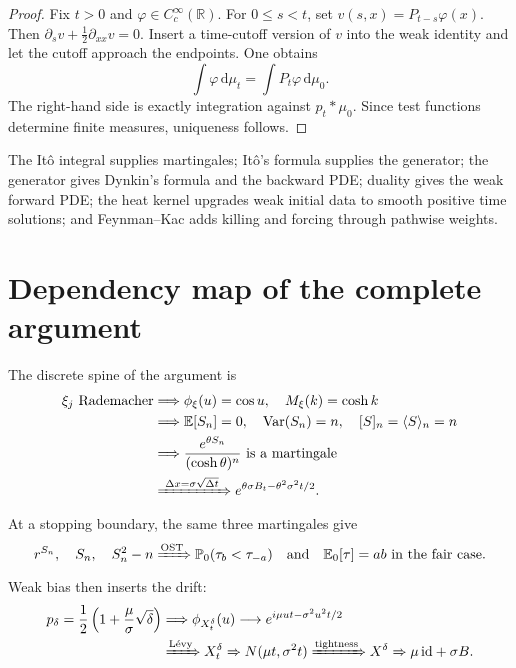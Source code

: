 \documentclass[10pt,a4paper]{article}
\numberwithin{equation}{section}
\theoremstyle{blueplain}
\theoremstyle{definition}
\newcommand{\E}{\mathbb E}
\newcommand{\Pp}{\mathbb P}
\newcommand{\R}{\mathbb R}
\newcommand{\dd}{\,\mathrm d}
\newcommand{\Var}{\operatorname{Var}}
\begin{document}
\begin{proof}
Fix \(t>0\) and \(\varphi\in C_c^\infty(\R)\).  For
\(0\le s<t\), set \(v(s,x)=P_{t-s}\varphi(x)\).  Then
\(\partial_sv+\tfrac12\partial_{xx}v=0\).  Insert a time-cutoff version of
\(v\) into the weak identity and let the cutoff approach the endpoints.  One
obtains
\[
  \int\varphi\dd\mu_t
  =\int P_t\varphi\dd\mu_0.
\]
The right-hand side is exactly integration against \(p_t*\mu_0\).  Since test
functions determine finite measures, uniqueness follows.
\end{proof}

\begin{keybox}
The It\^o integral supplies martingales; It\^o's formula supplies the generator;
the generator gives Dynkin's formula and the backward PDE; duality gives the
weak forward PDE; the heat kernel upgrades weak initial data to smooth positive
time solutions; and Feynman--Kac adds killing and forcing through pathwise
weights.
\end{keybox}

\clearpage
\section{Dependency map of the complete argument}
\begingroup
\small
\setlength{\abovedisplayskip}{4pt plus 1pt minus 1pt}
\setlength{\belowdisplayskip}{4pt plus 1pt minus 1pt}

The discrete spine of the argument is
\begin{align*}
  \xi_j\text{ Rademacher}
  &\Longrightarrow
  \phi_{\xi}(u)=\cos u,\quad M_{\xi}(k)=\cosh k\\
  &\Longrightarrow
  \E[S_n]=0,\quad \Var(S_n)=n,\quad [S]_n=\langle S\rangle_n=n\\
  &\Longrightarrow
  \frac{e^{\theta S_n}}{(\cosh\theta)^n}
  \text{ is a martingale}\\
  &\xRightarrow{\ \Delta x=\sigma\sqrt{\Delta t}\ }
  e^{\theta\sigma B_t-\theta^2\sigma^2t/2}.
\end{align*}
At a stopping boundary, the same three martingales give
\[
  r^{S_n},\quad S_n,\quad S_n^2-n
  \xRightarrow{\mathrm{OST}}
  \Pp_0(\tau_b<\tau_{-a})
  \quad\text{and}\quad
  \E_0[\tau]=ab\ \text{in the fair case}.
\]
Weak bias then inserts the drift:
\begin{align*}
  p_\delta=\frac12\left(1+\frac\mu\sigma\sqrt\delta\right)
  &\Longrightarrow
  \phi_{X_t^\delta}(u)
  \longrightarrow
  e^{i\mu ut-\sigma^2u^2t/2}\\
  &\xRightarrow{\text{L\'evy}}
  X_t^\delta\Rightarrow N(\mu t,\sigma^2t)
  \xRightarrow{\text{tightness}}
  X^\delta\Rightarrow\mu\,\mathrm{id}+\sigma B.
\end{align*}
\end{document}
